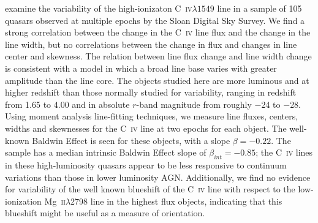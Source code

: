 \documentclass[a4paper,fleqn,usenatbib]{mnras}
\begin{document}
\citet{Wilhite2006} examine the variability of the high-ionizaton
C~\textsc{iv}$\lambda{1549}$ line in a sample of 105 quasars observed
at multiple epochs by the Sloan Digital Sky Survey.  We find a strong
correlation between the change in the C~\textsc{iv} line flux and the
change in the line width, but no correlations between the change in
flux and changes in line center and skewness.  The relation between
line flux change and line width change is consistent with a model in
which a broad line base varies with greater amplitude than the line
core. The objects studied here are more luminous and at higher
redshift than those normally studied for variability, ranging in
redshift from 1.65 to 4.00 and in absolute $r$-band magnitude from
roughly $-$24 to $-$28.  Using moment analysis line-fitting
techniques, we measure line fluxes, centers, widths and skewnesses for
the C~\textsc{iv} line at two epochs for each object.  The well-known
Baldwin Effect is seen for these objects, with a slope $\beta =
-0.22$.  The sample has a median intrinsic Baldwin Effect slope of
$\beta_{int} = -0.85$; the C~\textsc{iv} lines in these
high-luminosity quasars appear to be less responsive to continuum
variations than those in lower luminosity AGN.  Additionally, we find
no evidence for variability of the well known blueshift of the
C~\textsc{iv} line with respect to the low-ionization
Mg~\textsc{ii}$\lambda$2798 line in the highest flux objects,
indicating that this blueshift might be useful as a measure of
orientation.


\end{document}
